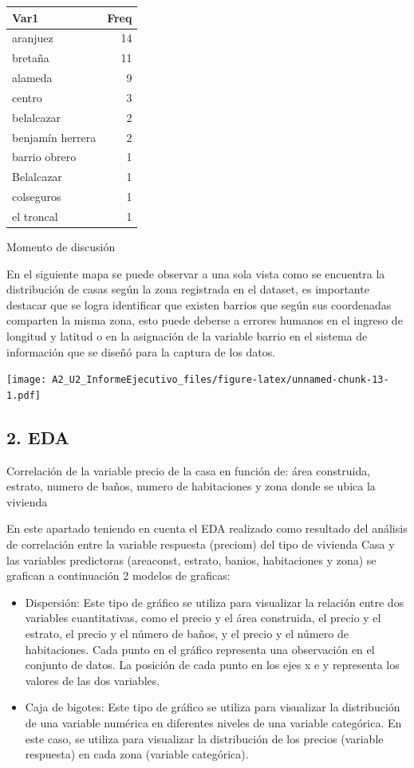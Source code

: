 \documentclass[
]{article}
\begin{document}
\begin{longtable}[]{@{}lr@{}}
\toprule\noalign{}
Var1 & Freq \\
\midrule\noalign{}
\endhead
\bottomrule\noalign{}
\endlastfoot
aranjuez & 14 \\
bretaña & 11 \\
alameda & 9 \\
centro & 3 \\
belalcazar & 2 \\
benjamín herrera & 2 \\
barrio obrero & 1 \\
Belalcazar & 1 \\
colseguros & 1 \\
el troncal & 1 \\
\end{longtable}

Momento de discusión

En el siguiente mapa se puede observar a una sola vista como se
encuentra la distribución de casas según la zona registrada en el
dataset, es importante destacar que se logra identificar que existen
barrios que según sus coordenadas comparten la misma zona, esto puede
deberse a errores humanos en el ingreso de longitud y latitud o en la
asignación de la variable barrio en el sistema de información que se
diseñó para la captura de los datos.

\texttt{[image: A2\_U2\_InformeEjecutivo\_files/figure-latex/unnamed-chunk-13-1.pdf]}

\subsection{2. EDA}\label{eda}

Correlación de la variable precio de la casa en función de: área
construida, estrato, numero de baños, numero de habitaciones y zona
donde se ubica la vivienda

En este apartado teniendo en cuenta el EDA realizado como resultado del
análisis de correlación entre la variable respuesta (preciom) del tipo
de vivienda Casa y las variables predictoras (areaconst, estrato,
banios, habitaciones y zona) se grafican a continuación 2 modelos de
graficas:

\begin{itemize}
\item
  Dispersión: Este tipo de gráfico se utiliza para visualizar la
  relación entre dos variables cuantitativas, como el precio y el área
  construida, el precio y el estrato, el precio y el número de baños, y
  el precio y el número de habitaciones. Cada punto en el gráfico
  representa una observación en el conjunto de datos. La posición de
  cada punto en los ejes x e y representa los valores de las dos
  variables.
\item
  Caja de bigotes: Este tipo de gráfico se utiliza para visualizar la
  distribución de una variable numérica en diferentes niveles de una
  variable categórica. En este caso, se utiliza para visualizar la
  distribución de los precios (variable respuesta) en cada zona
  (variable categórica).
\end{itemize}
\end{document}
